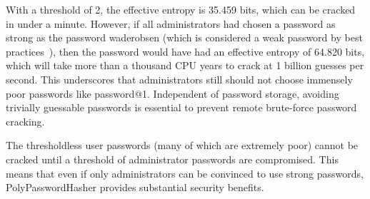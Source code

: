 With a threshold of 2, the effective entropy
is 35.459 bits, which can be cracked in under a minute.   
However, if all administrators had chosen a password
as strong as the password waderobsen (which is considered a weak
password by best practices~\cite{passwordlength}), then the password would 
have had an effective 
entropy of 64.820 bits, which will take more than a thousand CPU years to crack
at 1 billion guesses per second.   This underscores that administrators
still should not choose immensely poor passwords like password@1.   
Independent of password storage, avoiding trivially guessable passwords 
is essential to prevent remote brute-force password cracking.

The thresholdless user passwords (many of which are extremely poor) 
cannot be cracked until a threshold of administrator passwords are 
compromised.  This means that even if only administrators can be convinced to 
use strong passwords, PolyPasswordHasher provides substantial security benefits.





